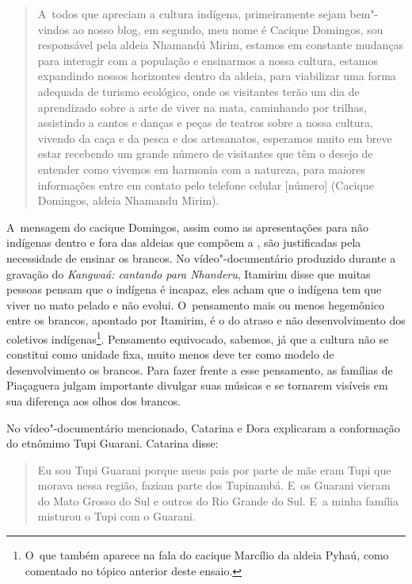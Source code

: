 \begin{quote}
\noindent
A~todos que apreciam a cultura indígena, primeiramente sejam bem"-vindos ao
nosso blog, em segundo, meu nome é Cacique Domingos, sou responsável
pela aldeia Nhamandú Mirim, estamos em constante mudanças para
interagir com a população e ensinarmos a nossa cultura, estamos
expandindo nossos horizontes dentro da aldeia, para viabilizar uma
forma adequada de turismo ecológico, onde os visitantes terão um dia de
aprendizado sobre a arte de viver na mata, caminhando por trilhas,
assistindo a cantos e danças e peças de teatros sobre a nossa cultura,
vivendo da caça e da pesca e dos artesanatos, esperamos muito em breve
estar recebendo um grande número de visitantes que têm o desejo de
entender como vivemos em harmonia com a natureza, para maiores
informações entre em contato pelo telefone celular [número] (Cacique
Domingos, aldeia Nhamandu Mirim).
\end{quote}

A~mensagem do cacique Domingos, assim como as apresentações para não
indígenas dentro e fora das aldeias que compõem a , são justificadas
pela necessidade de ensinar os brancos. No vídeo"-documentário produzido
durante a gravação do  \emph{Kangwaá: cantando para Nhanderu}, Itamirim
disse que muitas pessoas pensam que o indígena é incapaz, eles acham
que o indígena tem que viver no mato pelado e não evolui. O~pensamento
mais ou menos hegemônico entre os brancos, apontado por Itamirim, é o
do atraso e não desenvolvimento dos coletivos indígenas\footnote{O~que
também aparece na fala do cacique Marcílio da aldeia Pyhaú, como
comentado no tópico anterior deste ensaio.}. Pensamento equivocado,
sabemos, já que a cultura não se constitui como unidade fixa, muito
menos deve ter como modelo de desenvolvimento os brancos. Para fazer
frente a esse pensamento, as famílias de Piaçaguera julgam importante
divulgar suas músicas e se tornarem visíveis em sua diferença aos olhos
dos brancos.

No vídeo"-documentário mencionado, Catarina e Dora explicaram a
conformação do etnômimo Tupi Guarani. Catarina disse: 

\begin{quote}
\noindent
Eu sou Tupi Guarani porque meus pais por parte de mãe eram Tupi que
morava nessa região, faziam parte dos Tupinambá. E~os Guarani vieram do
Mato Grosso do Sul e outros do Rio Grande do Sul. E~a minha família
misturou o Tupi com o Guarani.
\end{quote}

